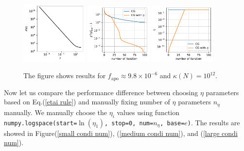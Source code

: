 \documentclass[twocolumn,linenumbers]{aastex631}
\begin{document}
\begin{figure}[htb!]
\centering
\includegraphics[width=0.3\textwidth]{0.1/large_condition_num/P_f.pdf}
\includegraphics[width=0.3\textwidth]{0.1/large_condition_num/chi2_CG.pdf}
\includegraphics[width=0.3\textwidth]{0.1/large_condition_num/eta_CG.pdf}
\caption{The figure shows results for $f_{\text{apo}}\approx 9.8\times10^{-6}$ 
    and $\kappa(N) = 10^{12}$.
}
\label{large condi num CG}
\end{figure}


Now let us compare the performance difference between choosing $\eta$
parameters based on Eq.(\ref{etai rule})
and manually fixing number of $\eta$ parameters $n_{\eta}$ manually.
We manually choose the $\eta_i$ values using function
\texttt{numpy.logspace(start=$\ln(\eta_1)$, stop=0, num=$n_{\eta}$, base=$e$)}.
The results are showed in Figure(\ref{small condi num}),
(\ref{medium condi num}), and (\ref{large condi num}).
\end{document}
